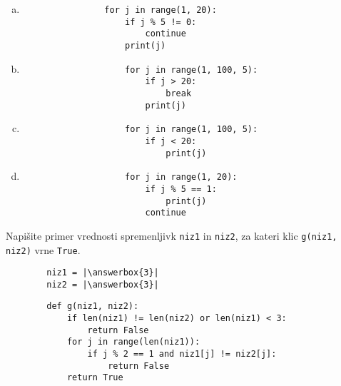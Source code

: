 \documentclass[arhiv, 10pt]{../izpit}
\newcommand{\inlinepy}[1]{\texttt{#1}}
\newcommand{\answerbox}[1]{\framebox{\vphantom{\large M}\hspace{#1cm}}}
\begin{document}
        \begin{multicols}{2}
        \begin{enumerate}[(a)]
\item 
            \begin{verbatim}
                for j in range(1, 20):
                    if j % 5 != 0:
                        continue
                    print(j)
            \end{verbatim}
        
\item 
                \begin{verbatim}
                    for j in range(1, 100, 5):
                        if j > 20:
                            break
                        print(j)
                \end{verbatim}
            
\item 
                \begin{verbatim}
                    for j in range(1, 100, 5):
                        if j < 20:
                            print(j)
                \end{verbatim}
            
\item 
                \begin{verbatim}
                    for j in range(1, 20):
                        if j % 5 == 1:
                            print(j)
                        continue
                \end{verbatim}
            
\end{enumerate}

        \end{multicols}
    
        \naloga*
        \begin{multicols}{2}
        \noindent
        Napišite primer vrednosti spremenljivk \inlinepy{niz1} in \inlinepy{niz2}, za kateri klic \inlinepy{g(niz1, niz2)} vrne \inlinepy{True}.
        \begin{verbatim}
        niz1 = |\answerbox{3}|
        niz2 = |\answerbox{3}|
        \end{verbatim}
        \vfil
        \columnbreak
        \begin{verbatim}
        def g(niz1, niz2):
            if len(niz1) != len(niz2) or len(niz1) < 3:
                return False
            for j in range(len(niz1)):
                if j % 2 == 1 and niz1[j] != niz2[j]:
                    return False
            return True
        \end{verbatim}
        \end{multicols}
    
\end{document}
